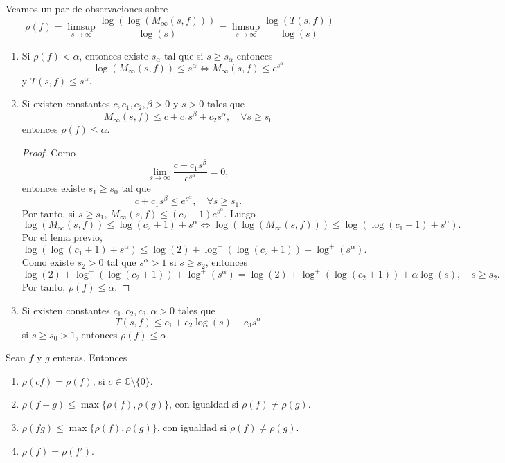\begin{remark}
    Veamos un par de observaciones sobre
    $$\rho(f) = \limsup_{s \to \infty} \frac{\log(\log(M_\infty(s, f)))}{\log(s)} = \limsup_{s \to \infty} \frac{\log(T(s, f))}{\log(s)}$$
    \begin{enumerate}
        \item Si $\rho(f) < \alpha$, entonces existe $s_\alpha$ tal que si $s \geq s_\alpha$ entonces
              $$\log(M_\infty(s, f)) \leq s^\alpha \Leftrightarrow M_\infty(s, f) \leq e^{s^\alpha}$$
              y $T(s, f) \leq s^\alpha$.

        \item Si existen constantes $c, c_1, c_2, \beta > 0$ y $s > 0$ tales que
              $$M_\infty(s, f) \leq c + c_1s^\beta + c_2s^\alpha, \quad \forall s \geq s_0$$
              entonces $\rho(f) \leq \alpha$.
              \begin{proof}
                  Como
                  $$\lim_{s \to \infty} \frac{c + c_1s^\beta}{e^{s^\alpha}} = 0,$$
                  entonces existe $s_1 \geq s_0$ tal que
                  $$c + c_1s^\beta \leq e^{s^\alpha}, \quad \forall s \geq s_1.$$
                  Por tanto, si $s \geq s_1$, $M_\infty(s, f) \leq (c_2+1)e^{s^\alpha}$.
                  Luego
                  $$\log(M_\infty(s, f)) \leq \log(c_2+1) + s^\alpha \Leftrightarrow \log(\log(M_\infty(s, f))) \leq \log(\log(c_1+1) +  s^\alpha).$$
                  Por el lema previo,
                  $$\log(\log(c_1+1) +  s^\alpha) \leq \log(2) + \log^+(\log(c_2+1)) + \log^+(s^\alpha).$$
                  Como existe $s_2 > 0$ tal que $s^\alpha > 1$ si $s \geq s_2$, entonces
                  $$\log(2) + \log^+(\log(c_2+1)) + \log^+(s^\alpha) = \log(2) + \log^+(\log(c_2+1)) + \alpha\log(s), \quad s \geq s_2.$$
                  Por tanto, $\rho(f) \leq \alpha$.
              \end{proof}

        \item Si existen constantes $c_1, c_2, c_3, \alpha > 0$ tales que
              $$T(s, f) \leq c_1 + c_2\log(s) + c_3s^\alpha$$
              si $s \geq s_0 > 1$, entonces $\rho(f) \leq \alpha$.
    \end{enumerate}
\end{remark}

\begin{theorem}
    Sean $f$ y $g$ enteras.
    Entonces
    \begin{enumerate}
        \item $\rho(cf) = \rho(f)$, si $c \in \mathbb{C} \setminus \{0\}$.
        \item $\rho(f+g) \leq \max\{\rho(f), \rho(g)\}$, con igualdad si $\rho(f) \neq \rho(g)$.
        \item $\rho(fg) \leq \max\{\rho(f), \rho(g)\}$, con igualdad si $\rho(f) \neq \rho(g)$.
        \item $\rho(f) = \rho(f')$.
    \end{enumerate}
\end{theorem}

